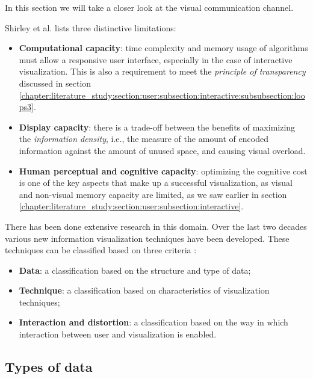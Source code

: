 In this section we will take a closer look at the visual communication channel.

Shirley et al.\cite{shirley:2009} lists three distinctive limitations:

\begin{itemize}
	\item \textbf{Computational capacity}: time complexity and memory usage of algorithms must allow a responsive user interface, especially in the case of interactive visualization. This is also a requirement to meet the \emph{principle of transparency} discussed in section \ref{chapter:literature_study:section:user:subsection:interactive:subsubsection:loops3}.
	\item \textbf{Display capacity}: there is a trade-off between the benefits of maximizing the \emph{information density}, i.e., the measure of the amount of encoded information against the amount of unused space, and causing visual overload.
	\item \textbf{Human perceptual and cognitive capacity}: optimizing the cognitive cost is one of the key aspects that make up a successful visualization, as visual and non-visual memory capacity are limited\cite{ware:2004}, as we saw earlier in section \ref{chapter:literature_study:section:user:subsection:interactive}.
\end{itemize}

There has been done extensive research in this domain. Over the last two decades various new information visualization techniques have been developed. These techniques can be classified based on three criteria \cite{keim:2002}:

\begin{itemize}
	\item \textbf{Data}: a classification based on the structure and type of data;
	\item \textbf{Technique}: a classification based on characteristics of visualization techniques;
	\item \textbf{Interaction and distortion}: a classification based on the way in which interaction between user and visualization is enabled.
\end{itemize}


\subsection{Types of data}\label{chapter:literature_study:section:interaction:subsection:datatypes}

